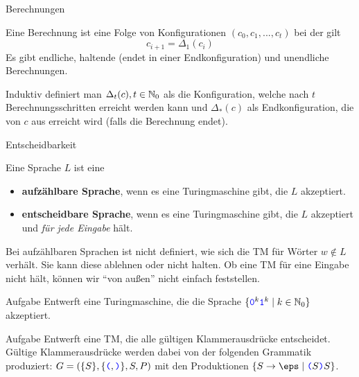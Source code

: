 \begin{frame}{Berechnungen}
	\begin{Definition}
		Eine Berechnung ist eine Folge von Konfigurationen $(c_0, c_1, ..., c_t)$ bei der gilt $$c_{i+1} = \Delta_1(c_i)$$ \pause
		Es gibt endliche, haltende (endet in einer Endkonfiguration) und unendliche Berechnungen.
		\bigskip
		
		\pause
		Induktiv definiert man $\Delta_t(c) , t\in\mathbb{N}_0$ als die Konfiguration, welche nach $t$ Berechnungsschritten erreicht werden kann und $\Delta_*(c)$ als Endkonfiguration, die von $c$ aus erreicht wird (falls die Berechnung endet).
	\end{Definition}
\end{frame}








\begin{frame}{Entscheidbarkeit}
	\begin{Definition}
		Eine Sprache $L$ ist eine   
		\begin{itemize}[<+->]
			\item \textbf{aufzählbare Sprache}, wenn es eine Turingmaschine gibt, die $L$ akzeptiert.
			\item \textbf{entscheidbare Sprache}, wenn es eine Turingmaschine gibt, die $L$ akzeptiert und \emph{für jede Eingabe} hält.
		\end{itemize}
	\end{Definition} \pause
	
	Bei aufzählbaren Sprachen ist nicht definiert, wie sich die TM für Wörter $ w \notin L$ verhält. Sie kann diese ablehnen oder nicht halten. Ob eine TM für eine Eingabe nicht hält, können wir \enquote{von außen} nicht einfach feststellen.
\end{frame}


\begin{frame}{Aufgabe}
	Entwerft eine Turingmaschine, die die Sprache $ \{\hbox{\textcolor{blue}{\texttt{0}}}^k\hbox{\textcolor{blue}{\texttt{1}}}^k \mid k\in \mathbb{N}_0 \} $ akzeptiert.
\end{frame}

\begin{frame}{Aufgabe}
	Entwerft eine TM, die alle gültigen Klammerausdrücke entscheidet.\\
	\medskip
	Gültige Klammerausdrücke werden dabei von der folgenden Grammatik produziert: $ G = (\{S\},\{\hbox{\textcolor{blue}{\texttt{(}}}, \hbox{\textcolor{blue}{\texttt{)}}}\}, S, P )$ mit den Produktionen $\set{ S \to \eps \mid \word (S\word )S}$.
\end{frame}
